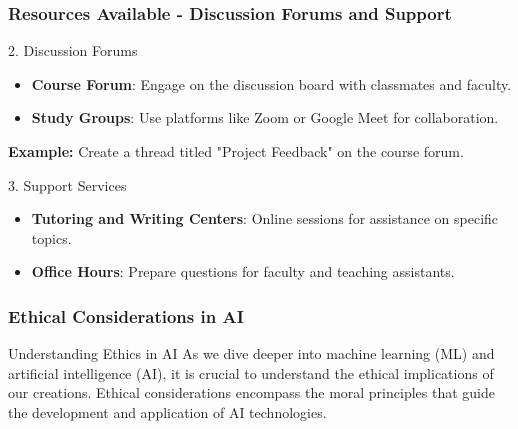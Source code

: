\documentclass[aspectratio=169]{beamer}
\begin{document}
\begin{frame}[fragile]
    \frametitle{Resources Available - Discussion Forums and Support}
    \begin{block}{2. Discussion Forums}
        \begin{itemize}
            \item \textbf{Course Forum}: Engage on the discussion board with classmates and faculty.
            \item \textbf{Study Groups}: Use platforms like Zoom or Google Meet for collaboration.
        \end{itemize}
        \textbf{Example:} Create a thread titled "Project Feedback" on the course forum.
    \end{block}

    \begin{block}{3. Support Services}
        \begin{itemize}
            \item \textbf{Tutoring and Writing Centers}: Online sessions for assistance on specific topics.
            \item \textbf{Office Hours}: Prepare questions for faculty and teaching assistants.
        \end{itemize}
    \end{block}
\end{frame}

\begin{frame}[fragile]
  \frametitle{Ethical Considerations in AI}
  
  \begin{block}{Understanding Ethics in AI}
    As we dive deeper into machine learning (ML) and artificial intelligence (AI), it is crucial to understand the ethical implications of our creations. Ethical considerations encompass the moral principles that guide the development and application of AI technologies.
  \end{block}
  
\end{frame}
\end{document}
